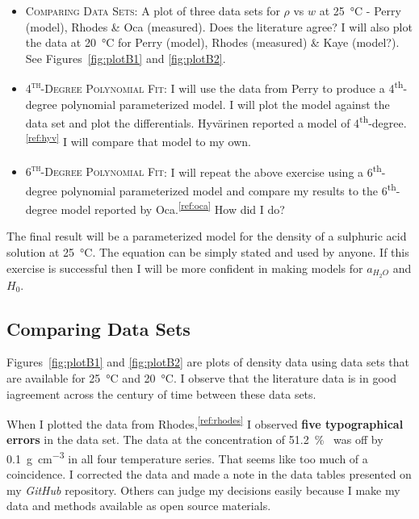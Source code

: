 \documentclass[]{tufte-handout}
\newcommand{\tss}[1]{\textsuperscript{#1}}
\begin{document}
 \begin{itemize}
 \item \textsc{Comparing Data Sets}: A plot of three data sets for $\rho$ vs $w$ at \qty{25}{\degreeCelsius} - Perry (model), Rhodes \& Oca (measured). Does the literature agree? I will also plot the data at \qty{20}{\degreeCelsius} for Perry (model), Rhodes (measured) \& Kaye (model?). See Figures~\ref{fig:plotB1} and \vref{fig:plotB2}.
 
 \item \textsc{4\tss{th}-Degree Polynomial Fit}: I will use the data from Perry to produce a 4\tss{th}-degree polynomial parameterized model. I will plot the model against the data set and plot the differentials. Hyvärinen reported a model of 4\tss{th}-degree.\tss{\ref{ref:hyv}} I will compare that model to my own.
 
 \item \textsc{6\tss{th}-Degree Polynomial Fit}: I will repeat the above exercise using a 6\tss{th}-degree polynomial parameterized model and compare my results to the 6\tss{th}-degree model reported by Oca.\tss{\ref{ref:oca}}  How did I do? %
 
 \end{itemize}
 
The final result will be a parameterized model for the density of a sulphuric acid solution at \qty{25}{\degreeCelsius}. The equation can be simply stated and used by anyone. If this exercise is successful then I will be more confident in making models for $a_{H_2O}$ and $H_0$.


\subsection{Comparing Data Sets}

Figures~\ref{fig:plotB1} and \vref{fig:plotB2} are plots of density data using data sets that are available for \qty{25}{\degreeCelsius} and \qty{20}{\degreeCelsius}. I observe that the literature data is in good iagreement across the century of time between these data sets.

When I plotted the data from Rhodes,\tss{\ref{ref:rhodes}} I observed \textbf{five typographical errors} in the data set. The data at the concentration of \qty{51.2}{\percent{}} was off by \qty{+0.1}{\gram\per\centi\meter\cubed} in all four temperature series. That seems like too much of a coincidence. I corrected the data and made a note in the data tables presented on my \textit{GitHub} repository. Others can judge my decisions easily because I make my data and methods available as open source materials.
\end{document}
